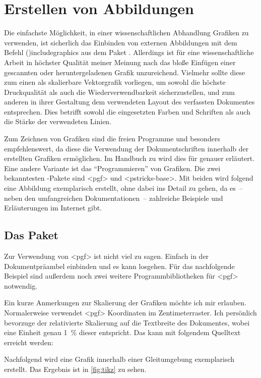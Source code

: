 \documentclass[%
  english,ngerman,%
  cdgeometry=no,DIV=12,%
  cd=false,cdfont=false,cdtitle=true,%
  headings=normal,%
  automark,%
  listof=toc,%
]{tudscrartcl}
\begin{document}
\section{%
  Erstellen von Abbildungen%
  \label{sec:figures}%
}

Die einfachste Möglichkeit, in einer wissenschaftlichen Abhandlung Grafiken zu 
verwenden, ist sicherlich das Einbinden von externen Abbildungen mit dem Befehl 
\Macro(){includegraphics} aus dem Paket . 
Allerdings ist für eine wissenschaftliche Arbeit in höchster Qualität meiner 
Meinung nach das bloße Einfügen einer gescannten oder heruntergeladenen Grafik 
unzureichend. Vielmehr sollte diese zum einen als skalierbare Vektorgrafik 
vorliegen, um sowohl die höchste Druckqualität als auch die 
Wiederverwendbarkeit sicherzustellen, und zum anderen in ihrer Gestaltung dem 
verwendeten Layout des verfassten Dokumentes entsprechen. Dies betrifft sowohl 
die eingesetzten Farben und Schriften als auch die Stärke der verwendeten 
Linien.

Zum Zeichnen von Grafiken sind die freien Programme  und 
besonders  empfehlenswert, da diese die Verwendung der 
Dokumentschriften innerhalb der erstellten Grafiken ermöglichen. Im Handbuch zu 
\TUDScript wird dies für  
genauer erläutert. Eine andere Variante ist das \enquote{Programmieren} von 
Grafiken. Die zwei bekanntesten -Pakete sind 
<pgf> und <pstricks-base>. Mit beiden wird 
folgend eine Abbildung exemplarisch erstellt, ohne dabei ins Detail zu gehen, 
da es~-- neben den umfangreichen Dokumentationen~-- zahlreiche Beispiele und 
Erläuterungen im Internet gibt.



\subsection{Das Paket }

Zur Verwendung von <pgf> ist nicht viel zu sagen. Einfach in der 
Dokumentpräambel einbinden und es kann losgehen. Für das nachfolgende Beispiel 
sind außerdem noch zwei weitere Programmbibliotheken für <pgf> 
notwendig.
%
\begin{Hint}
\usepackage{tikz}
\usetikzlibrary{chains}
\usetikzlibrary{decorations.markings}
\tikzset{on grid}
\end{Hint}
%
Ein kurze Anmerkungen zur Skalierung der Grafiken möchte ich mir erlauben. 
Normalerweise verwendet <pgf> Koordinaten im Zentimeterraster. 
Ich persönlich bevorzuge der relativierte Skalierung auf die Textbreite des 
Dokumentes, wobei eine Einheit genau \SI{1}{\percent} dieser entspricht. Das 
kann mit folgendem Quelltext erreicht werden:
%
\CodeHook{\renewcommand\newlength[1]{}}
\begin{Hint*}
\newlength{\tikzunit}
\setlength{\tikzunit}{.01\textwidth}
\tikzset{x=\tikzunit,y=\tikzunit}
\end{Hint*}
%
Nachfolgend wird eine Grafik innerhalb einer Gleitumgebung exemplarisch 
erstellt. Das Ergebnis ist in \autoref{fig:tikz} zu sehen.
\end{document}
